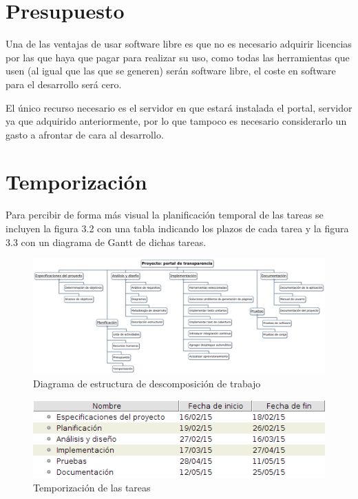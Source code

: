 \section{Presupuesto}

Una de las ventajas de usar software libre es que no es necesario adquirir licencias por las que haya que pagar para realizar su uso, como todas las herramientas que usen (al igual que las que se generen) serán software libre, el coste en software para el desarrollo será cero.

\bigskip

El único recurso necesario es el servidor en que estará instalada el portal, servidor ya que adquirido anteriormente, por lo que tampoco es necesario considerarlo un gasto a afrontar de cara al desarrollo.

\section{Temporización}

Para percibir de forma más visual la planificación temporal de las tareas se incluyen la figura 3.2 con una tabla indicando los plazos de cada tarea y la figura 3.3 con un diagrama de Gantt de dichas tareas.
\newpage

\begin{figure}[!ht]
  \begin{center}
    \includegraphics[scale=0.25,angle=90]{../images/diagrama_edt.png}
    \caption{Diagrama de estructura de descomposición de trabajo}
    \label{fig:diag_edt}
  \end{center}
\end{figure}

\newpage
\begin{figure}[!ht]
  \begin{center}
    \includegraphics[width=1\textwidth]{../images/tempo_tareas.png}
    \caption{Temporización de las tareas}
    \label{fig:tempo_tareas}
  \end{center}
\end{figure}

